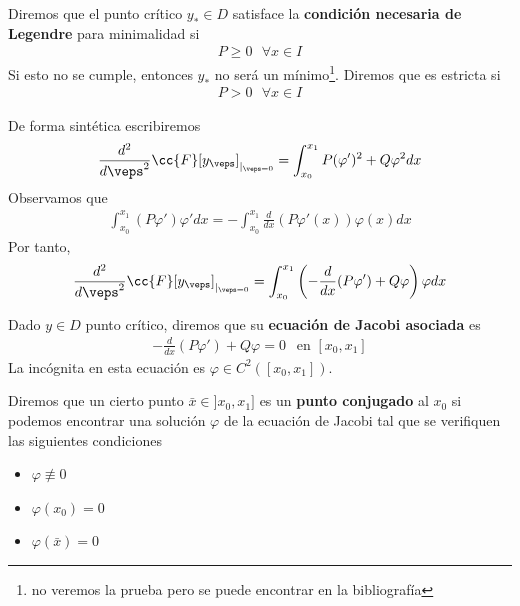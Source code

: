 \begin{definicion}
    Diremos que el punto crítico $y_*\in D$ satisface la \textbf{condición necesaria de Legendre} para minimalidad si 
    \begin{gather*}
        P \geq 0\ \ \ \forall x \in  I
    \end{gather*}
    Si esto no se cumple, entonces $y_*$ no será un mínimo\footnote{no veremos la prueba pero se puede encontrar en la bibliografía}. Diremos que es estricta si 
    \begin{gather*}
        P > 0\ \ \ \forall x \in  I
    \end{gather*}
\end{definicion}

De forma sintética escribiremos
\begin{gather*}
    \frac{d^2}{d\veps^2}\cc{F}[y_\veps]_{|_{\veps=0}} = \int_{x_0}^{x_1} P(\varphi')^2 + Q\varphi^2 dx
\end{gather*}
Observamos que 
\begin{gather*}
    \int_{x_0}^{x_1} (P\varphi')\varphi' dx = -\int_{x_0}^{x_1} \frac{d}{dx} (P\varphi'(x)) \varphi(x) dx
\end{gather*}
Por tanto,
\begin{gather*}
    \frac{d^2}{d\veps^2}\cc{F}[y_\veps]_{|_{\veps=0}} = \int_{x_0}^{x_1} \left( -\frac{d}{dx} (P\varphi') + Q\varphi \right) \varphi dx
\end{gather*}

\begin{definicion}
    Dado $y\in D$ punto crítico, diremos que su \textbf{ecuación de Jacobi asociada} es 
    \begin{gather*}
        -\frac{d}{dx}(P\varphi') + Q\varphi = 0 \ \ \text{ en } [x_0, x_1]
    \end{gather*}
    La incógnita en esta ecuación es $\varphi\in C^2([x_0, x_1])$.
\end{definicion}

\begin{definicion}
    Diremos que un cierto punto $\bar{x}\in ]x_0, x_1]$ es un \textbf{punto conjugado} al $x_0$ si podemos encontrar una solución $\varphi$ de la ecuación de Jacobi tal que  se verifiquen las siguientes condiciones
    \begin{itemize}
        \item $\varphi \not\equiv 0$
        \item $\varphi(x_0)=0$
        \item $\varphi(\bar{x})=0$
    \end{itemize}
\end{definicion}

